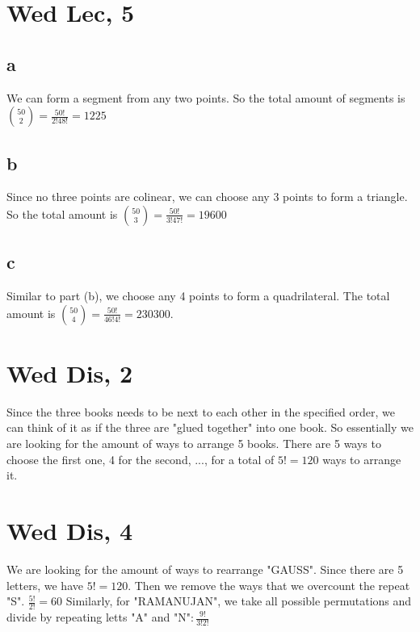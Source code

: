 \documentclass[12pt]{article}
\begin{document}
\section{Wed Lec, 5}

\subsection{a}
We can form a segment from any two points. So the total amount of segments is $\binom{50}{2} = \frac{50!}{2!48!}=1225$

\subsection{b}
Since no three points are colinear, we can choose any 3 points to form a triangle. So the total amount is $\binom{50}{3} = \frac{50!}{3!47!} = 19600$

\subsection{c}
Similar to part (b), we choose any 4 points to form a quadrilateral. The total amount is $\binom {50} {4} = \frac{50!}{46!4!} = 230300$.

\newpage

\section{Wed Dis, 2}
Since the three books needs to be next to each other in the specified order, we can think of it as if the three are "glued together" into one book. So essentially we are looking for the amount of ways to arrange 5 books.
\newline
There are 5 ways to choose the first one, 4 for the second, ..., for a total of $5! = 120$ ways to arrange it.

\section{Wed Dis, 4}
We are looking for the amount of ways to rearrange "GAUSS". Since there are 5 letters, we have $5!=120$. Then we remove the ways that we overcount the repeat "S". $\frac{5!}{2!} = 60$
\newline
Similarly, for "RAMANUJAN", we take all possible permutations and divide by repeating letts "A" and "N"$: \frac{9!}{3!2!}$

\newpage
\end{document}
